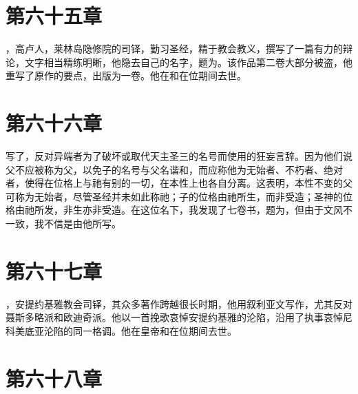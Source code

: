 
\section{第六十五章}

，高卢人，莱林岛隐修院的司铎，勤习圣经，精于教会教义，撰写了一篇有力的辩论，文字相当精练明晰，他隐去自己的名字，题为。该作品第二卷大部分被盗，他重写了原作的要点，出版为一卷。他在和在位期间去世。\par


\section{第六十六章}

写了，反对异端者为了破坏或取代天主圣三的名号而使用的狂妄言辞。因为他们说父不应被称为父，以免子的名号与父名谐和，而应称他为无始者、不朽者、绝对者，使得在位格上与祂有别的一切，在本性上也各自分离。这表明，本性不变的父可称为无始者，尽管圣经并未如此称祂；子的位格由祂所生，而非受造；圣神的位格由祂所发，非生亦非受造。在这位名下，我发现了七卷书，题为，但由于文风不一致，我不信是由他所写。\par


\section{第六十七章}

，安提约基雅教会司铎，其众多著作跨越很长时期，他用叙利亚文写作，尤其反对聂斯多略派和欧迪奇派。他以一首挽歌哀悼安提约基雅的沦陷，沿用了执事哀悼尼科美底亚沦陷的同一格调。他在皇帝和在位期间去世。\par


\section{第六十八章}

